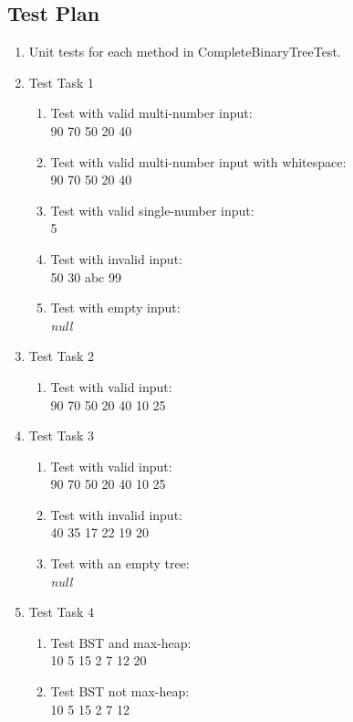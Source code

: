 \documentclass{scrartcl}
\begin{document}
\subsection{Test Plan}
\begin{enumerate}
  \item Unit tests for each method in CompleteBinaryTreeTest.
  \item Test Task 1
  \begin{enumerate}
    \item Test with valid multi-number input:\\ 90 70 50 20 40\label{task1-1}
    \item Test with valid multi-number input with whitespace:\\ 90 70 50 20 40\label{task1-2}
    \item Test with valid single-number input:\\ 5\label{task1-3}
    \item Test with invalid input:\\ 50 30 abc 99\label{task1-4}
    \item Test with empty input:\\ \emph{null}\label{task1-5}
  \end{enumerate}
  \item Test Task 2
  \begin{enumerate}
    \item Test with valid input:\\   90 70 50 20 40 10 25\label{task2-1}
  \end{enumerate}
  \item Test Task 3
  \begin{enumerate}
    \item Test with valid input:\\ 90 70 50 20 40 10 25\label{task3-1}
    \item Test with invalid input:\\ 40 35 17 22 19 20\label{task3-2}
    \item Test with an empty tree:\\ \emph{null}\label{task3-3}
  \end{enumerate}
  \item Test Task 4
  \begin{enumerate}
    \item Test BST and max-heap:\\ 10 5 15 2 7 12 20\label{task4-1}
    \item Test BST not max-heap:\\ 10 5 15 2 7 12\label{task4-2}

\end{enumerate}
\end{enumerate}
\end{document}
